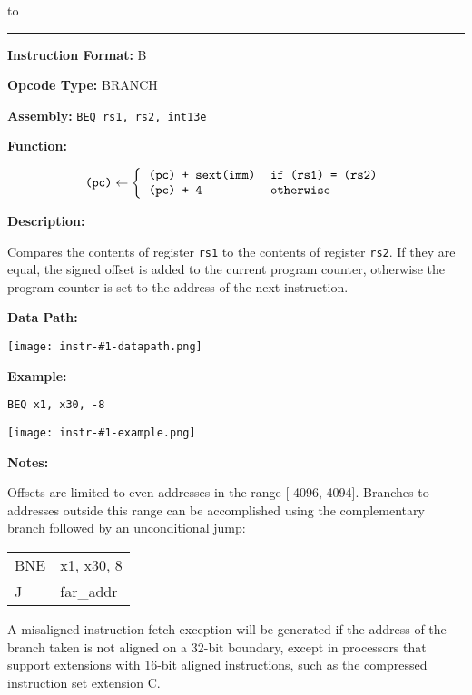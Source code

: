 \documentclass[11pt,twoside,letterpaper,titlepage]{report}
\newcommand{\minipagerestore}{
    \setlength{\parindent}{0pt}
    \setlength{\parskip}{0.5\baselineskip}
}
\newenvironment{instrheader}[5]
{%
\hbox to \textwidth{{\huge\textbf{#1}} \hfil {\Large #2}}
\rule{\textwidth}{0.4pt}

\par
\begin{minipage}{0.5\textwidth}
\textbf{Instruction Format:} #3
\end{minipage}
\begin{minipage}{0.45\textwidth}
\textbf{Opcode Type:} #4
\end{minipage}
\vspace*{0.5\baselineskip}

\par
\textbf{Assembly:} \texttt{#5}
\vspace*{0.5\baselineskip}
\ignorespacesafterend
}
{%
}
\newenvironment{instrfunction}
{%
\par
\textbf{Function:} %
}
{%
\vspace*{0.5\baselineskip}
\ignorespacesafterend
}
\newenvironment{instrdesc}
{%
\par
\textbf{Description:}
\vspace*{0.2\baselineskip}
\par
\hfill\begin{minipage}{\dimexpr\textwidth-1em}\minipagerestore
}
{%
\end{minipage}
\vspace*{\baselineskip}
\ignorespacesafterend
}
\newcommand{\instrdatapathimg}[1]{
\par
\textbf{Data Path:}
\begin{center}
\texttt{[image: instr-\#1-datapath.png]}
\end{center}
}
\newenvironment{instrexample}
{%
\par
\textbf{Example:} %
}
{%
}
\newcommand{\instrexampleimg}[1]{
\par
\begin{center}
\texttt{[image: instr-\#1-example.png]}
\end{center}    
\vspace*{0.5\baselineskip}
}
\newenvironment{instrnotes}
{%
\par
\textbf{Notes:}
\vspace*{0.3\baselineskip}
\par
\hfill\begin{minipage}{\dimexpr\textwidth-1em}\minipagerestore
}
{%
\end{minipage}
}
\begin{document}
\begin{instrheader}{BEQ}{Branch if equal}{B}{BRANCH}{BEQ rs1, rs2, int13e}
\end{instrheader}
\begin{instrfunction}
    \[
    \texttt{(pc)} \leftarrow \left\{
    \begin{tabular}{>{\ttfamily}l >{\ttfamily}l}
        (pc) + sext(imm) & if (rs1) = (rs2)\\
        (pc) + 4 & otherwise
    \end{tabular} \right.
    \]
\end{instrfunction}
\begin{instrdesc}
    Compares the contents of register \texttt{rs1} to the contents of register \texttt{rs2}. If they
    are equal, the signed offset is added to the current program counter, otherwise
    the program counter is set to the address of the next instruction.
\end{instrdesc}
\instrdatapathimg{beq}
\begin{instrexample}
    \texttt{BEQ x1, x30, -8}
\end{instrexample}
\instrexampleimg{beq}
\begin{instrnotes}
    Offsets are limited to even addresses in the range [-4096, 4094]. Branches to addresses
    outside this range can be accomplished using the complementary branch followed by an
    unconditional jump:
    
    \par
    \begin{tabular}{>{\ttfamily}l >{\ttfamily}l}
        BNE & x1, x30, 8\\
        J & far\_addr
    \end{tabular}
    
    \par
    A misaligned instruction fetch exception will be generated if the address of the branch
    taken is not aligned on a 32-bit boundary, except in processors that support extensions with
    16-bit aligned instructions, such as the compressed instruction set extension C.
\end{instrnotes}
\newpage
\end{document}

